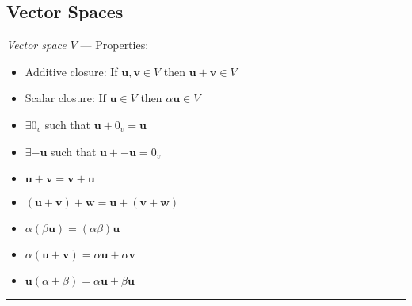 \subsection*{Vector Spaces}
\emph{Vector space $V$} --- Properties:
\begin{multicols}{2}
\begin{itemize}
    \item Additive closure: If $\boldsymbol{u},\boldsymbol{v} \in V$ then $\boldsymbol{u} + \boldsymbol{v} \in V$ 
    \item Scalar closure: If $\boldsymbol{u} \in V$ then $\alpha\boldsymbol{u} \in V$ 
    \item $\exists 0_v$ such that $\boldsymbol{u} + 0_v = \boldsymbol{u}$
    \item $\exists \boldsymbol{-u}$ such that $\boldsymbol{u} + \boldsymbol{-u} = 0_v$
    \item $\boldsymbol{u} + \boldsymbol{v} = \boldsymbol{v} + \boldsymbol{u}$ 
    \item $(\boldsymbol{u} + \boldsymbol{v}) + \boldsymbol{w} = \boldsymbol{u} + (\boldsymbol{v} + \boldsymbol{w})$ 
    \item $\alpha(\beta\boldsymbol{u})= (\alpha\beta)\boldsymbol{u}$ 
    \item $\alpha(\boldsymbol{u} + \boldsymbol{v}) = \alpha\boldsymbol{u} + \alpha\boldsymbol{v}$ 
    \item $\boldsymbol{u}(\alpha + \beta) = \alpha\boldsymbol{u} + \beta\boldsymbol{u}$ 
\end{itemize}
\end{multicols}

{\color{lightgray}\hrule height 0.001mm}

